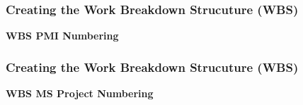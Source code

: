 \documentclass{beamer}
\begin{document}

\begin{frame}
\frametitle{Creating the Work Breakdown Strucuture (WBS)}
\textbf{WBS PMI Numbering}
\begin{figure}
\end{figure}
\end{frame}


\begin{frame}
\frametitle{Creating the Work Breakdown Strucuture (WBS)}
\textbf{WBS MS Project Numbering}
\begin{figure}
\end{figure}
\end{frame}
\end{document}

